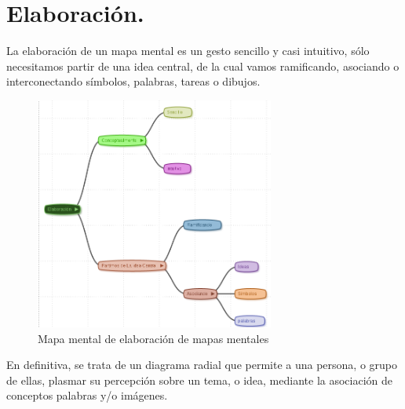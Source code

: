 \section{Elaboración.}

La elaboración de un mapa mental es un gesto sencillo y casi intuitivo, sólo necesitamos partir de una idea central, de la cual vamos ramificando, asociando o interconectando símbolos, palabras, tareas o dibujos. 

\begin{figure}[htbp]
\centering
\includegraphics[width=0.7\textwidth]{imagenes/Elaboracion.png}
\caption{Mapa mental de elaboración de mapas mentales}
\label{fig:elaboracion}
\end{figure}

En definitiva, se trata de un diagrama radial que permite a una persona, o grupo de ellas,  plasmar su percepción sobre un tema, o idea, mediante la asociación de conceptos palabras y/o imágenes.

